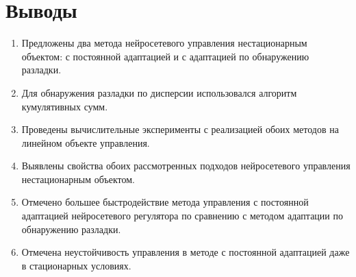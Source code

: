 \section{Выводы}

\begin{enumerate}
\item Предложены два метода нейросетевого управления нестационарным
  объектом: с постоянной адаптацией и с адаптацией по обнаружению
  разладки.
\item Для обнаружения разладки по дисперсии использовался алгоритм
  кумулятивных сумм.
\item Проведены вычислительные эксперименты с реализацией обоих
  методов на линейном объекте управления.
\item Выявлены свойства обоих рассмотренных подходов нейросетевого
  управления нестационарным объектом.
\item Отмечено большее быстродействие метода управления с постоянной
  адаптацией нейросетевого регулятора по сравнению с методом адаптации
  по обнаружению разладки.
\item Отмечена неустойчивость управления в методе с постоянной
  адаптацией даже в стационарных условиях.
\end{enumerate}
